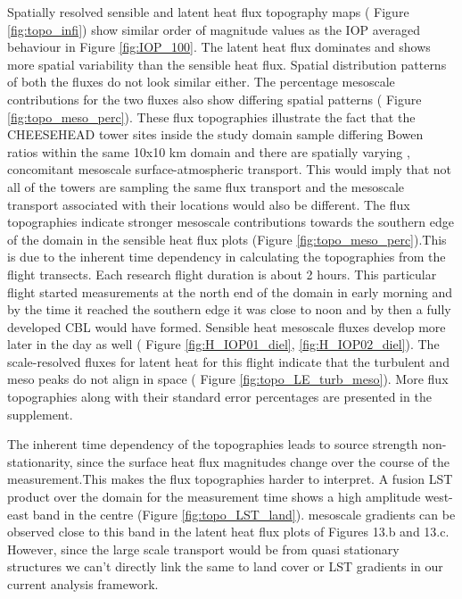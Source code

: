\documentclass[draft]{agujournal2019}
\begin{document}
Spatially resolved sensible and latent heat flux topography maps ( Figure \ref{fig:topo_infi}) show similar order of magnitude values as  the IOP averaged behaviour in Figure \ref{fig:IOP_100}. The latent heat flux dominates and shows more spatial variability than the sensible heat flux. Spatial distribution patterns of both the fluxes do not look similar either. The percentage mesoscale contributions for the two fluxes also show differing spatial patterns ( Figure \ref{fig:topo_meso_perc}). These flux topographies illustrate the fact that the CHEESEHEAD tower sites inside the study domain sample differing Bowen ratios within the same 10x10 km domain and there are spatially varying , concomitant  mesoscale surface-atmospheric transport. This would imply that not all of the towers are sampling the same flux transport and the mesoscale transport associated with their locations would also be different. The flux topographies indicate stronger mesoscale contributions towards the southern edge of the domain in the sensible heat flux plots (Figure \ref{fig:topo_meso_perc}).This is due to the inherent time dependency in calculating the topographies from the flight transects. Each research flight duration is about 2 hours. This particular flight started measurements at the north end of the domain in early morning and by the time it reached the southern edge it was close to noon and by then a fully developed CBL would have formed. Sensible heat mesoscale fluxes develop more later in the day as well ( Figure \ref{fig:H_IOP01_diel}, \ref{fig:H_IOP02_diel}). The scale-resolved fluxes for latent heat for this flight indicate that the turbulent and meso peaks do not align in space ( Figure \ref{fig:topo_LE_turb_meso}). More flux topographies along with their standard error percentages \cite{gatz_standard_1995} are presented in the supplement. 

The inherent time dependency of the topographies leads to source strength non-stationarity, since the surface heat flux magnitudes change over the course of the measurement.This makes the flux topographies harder to interpret. A fusion LST product over the domain \cite{desai_multisensor_2021} for the measurement time shows a high amplitude west-east band in the centre (Figure \ref{fig:topo_LST_land}). mesoscale gradients can be observed close to this band in the latent heat flux plots of Figures 13.b and 13.c. However, since the large scale transport would be from quasi stationary structures we can't directly link the same to land cover or LST gradients in our current analysis framework. 
\end{document}
